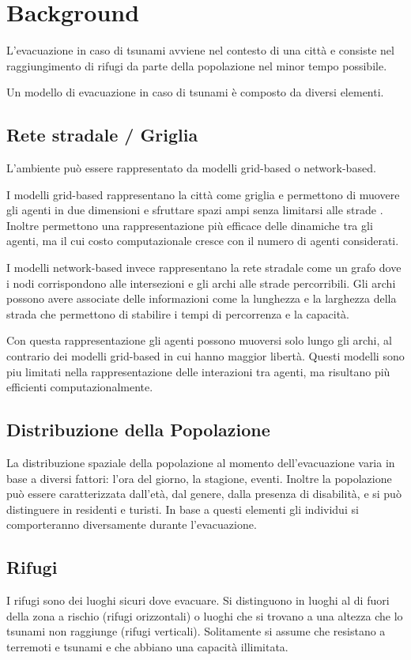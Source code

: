 \section{Background}
\label{sec:background}
L'evacuazione in caso di tsunami avviene nel contesto di una città e 
consiste nel raggiungimento di rifugi da parte della popolazione nel minor tempo possibile.

Un modello di evacuazione in caso di tsunami è composto da diversi elementi.

\subsection{Rete stradale / Griglia}
L'ambiente può essere rappresentato da modelli grid-based o network-based.

I modelli grid-based rappresentano la città come griglia e permettono di muovere gli agenti in due dimensioni 
e sfruttare spazi ampi senza limitarsi alle strade \parencite{makinoshima2018enhancing}.
Inoltre permettono una rappresentazione più efficace delle dinamiche tra gli agenti, ma il cui costo computazionale 
cresce con il numero di agenti considerati.

I modelli network-based invece rappresentano la rete stradale come un grafo dove i nodi corrispondono alle intersezioni e gli archi alle strade percorribili.
Gli archi possono avere associate delle informazioni come la lunghezza e la larghezza della strada che permettono di stabilire i tempi di percorrenza e la capacità.

Con questa rappresentazione gli agenti possono muoversi solo lungo gli archi, al contrario dei modelli grid-based in cui hanno maggior libertà.
Questi modelli sono piu limitati nella rappresentazione delle interazioni tra agenti, ma risultano più efficienti computazionalmente.

\subsection{Distribuzione della Popolazione}
La distribuzione spaziale della popolazione al momento dell'evacuazione varia in base a diversi fattori:
l'ora del giorno, la stagione, eventi. 
Inoltre la popolazione può essere caratterizzata dall'età, dal genere, dalla presenza di disabilità, 
e si può distinguere in residenti e turisti.
%
In base a questi elementi gli individui si comporteranno diversamente durante l'evacuazione.

\subsection{Rifugi}
I rifugi sono dei luoghi sicuri dove evacuare.
Si distinguono in luoghi al di fuori della zona a rischio (rifugi orizzontali) o
luoghi che si trovano a una altezza che lo tsunami non raggiunge (rifugi verticali).
%
Solitamente si assume che resistano a terremoti e tsunami e
che abbiano una capacità illimitata.

